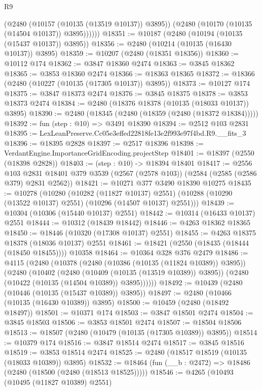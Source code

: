 \begin{lexlean}{R9}
\begin{coremodule}
            (@2480 (@10157 (@10135 (@13519 @10137)) @3895))
            (@2480 (@10170 (@10135 (@14504 @10137)) @3895))))))
@18351 := @10187 (@2480 (@10194 (@10135 (@15437 @10137)) @3895))
@18356 := @2480 (@10214 (@10135 (@16430 @10137)) @3895)
@18359 := @10207 (@2480 (@18351 @18356))
@18360 := @10112 @174
@18362 := @3847 @18360 @2474
@18363 := @3845 @18362
@18365 := @3853 @18360 @2474
@18366 := @18363 @18365
@18372 := @18366 (@2480 (@10227 (@10135 (@17305 @10137)) @3895))
@18373 := @10127 @174
@18375 := @3847 @18373 @2474
@18376 := @3845 @18375
@18378 := @3853 @18373 @2474
@18384 := @2480 (@18376 @18378 (@10135 (@18033 @10137)) @3895)
@18390 := @2480 (@18345 (@2480 (@18359 (@2480 (@18372 @18384)))))
@18392 := fun (step : @10) => @3491 @18390
@18394 := @2512 @103 @2831
@18395 := LexLeanPreserve.Cc05e3effed22818fe13e2f993e97f4bd.R9.__fits_3
@18396 := @18395 @2828
@18397 := @2517 @18396
@18398 := VerdantEngine.ImportanceGridEncoding.projectStep
@18401 := @18397 (@2550 (@18398 @2828))
@18403 := (step : @10) -> @18394 @18401
@18417 := @2556
    @103
    @2831
    @18401
    @379
    @3539
    (@2567 (@2578 @103))
    (@2584 (@2585 (@2586 @379) @2831 @2562))
@18421 := @10271 @377 @3490 @18390 @10275
@18435 := @10278
    (@10280
      (@10282 (@11827 @10137) @2551)
      (@10288 (@10290 (@13522 @10137) @2551) (@10296 (@14507 @10137) @2551)))
@18439 := @10304 (@10306 (@15440 @10137) @2551)
@18442 := @10314 (@16433 @10137) @2551
@18444 := @10312 (@18439 @18442)
@18446 := @4263 @18362 @18365
@18450 := @18446 (@10320 (@17308 @10137) @2551)
@18455 := @4263 @18375 @18378 (@18036 @10137) @2551
@18461 := @18421 (@2550 (@18435 (@18444 (@18450 @18455)))) @10358
@18464 := @10364 @328 @376 @2479
@18486 := @4115
    (@2480
      (@10378
        (@2480 (@10386 (@10135 (@11824 @10389)) @3895))
        (@2480
          (@10402
            (@2480 (@10409 (@10135 (@13519 @10389)) @3895))
            (@2480 (@10422 (@10135 (@14504 @10389)) @3895))))))
@18492 := @10439 (@2480 (@10446 (@10135 (@15437 @10389)) @3895))
@18497 := @2480 (@10466 (@10135 (@16430 @10389)) @3895)
@18500 := @10459 (@2480 (@18492 @18497))
@18501 := @10371 @174
@18503 := @3847 @18501 @2474
@18504 := @3845 @18503
@18506 := @3853 @18501 @2474
@18507 := @18504 @18506
@18513 := @18507 (@2480 (@10479 (@10135 (@17305 @10389)) @3895))
@18514 := @10379 @174
@18516 := @3847 @18514 @2474
@18517 := @3845 @18516
@18519 := @3853 @18514 @2474
@18525 := @2480 (@18517 @18519 (@10135 (@18033 @10389)) @3895)
@18532 := @18464 (fun (__b : @2472) => @18486 (@2480 (@18500 (@2480 (@18513 @18525)))))
@18546 := @4265
    (@10493
      (@10495 (@11827 @10389) @2551)

\end{coremodule}
\end{lexlean}
